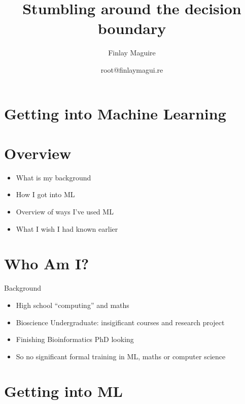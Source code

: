 \documentclass[ignorenonframetext,]{beamer}
\title{Stumbling around the decision boundary}
\author{Finlay Maguire}
\date{root@finlaymagui.re}
\begin{document}
\frame{\titlepage}

\section{Getting into Machine
Learning}\label{getting-into-machine-learning}

\section{Overview}\label{overview}

\begin{frame}

\begin{itemize}
\itemsep1pt\parskip0pt
\item
  What is my background
\item
  How I got into ML
\item
  Overview of ways I've used ML
\item
  What I wish I had known earlier
\end{itemize}

\end{frame}

\section{Who Am I?}\label{who-am-i}

\begin{frame}{Background}

\begin{itemize}
\itemsep1pt\parskip0pt
\item
  High school ``computing'' and maths
\item
  Bioscience Undergraduate: insigificant courses and research project
\item
  Finishing Bioinformatics PhD looking
\item
  So no significant formal training in ML, maths or computer science
\end{itemize}

\end{frame}

\section{Getting into ML}\label{getting-into-ml}
\end{document}
